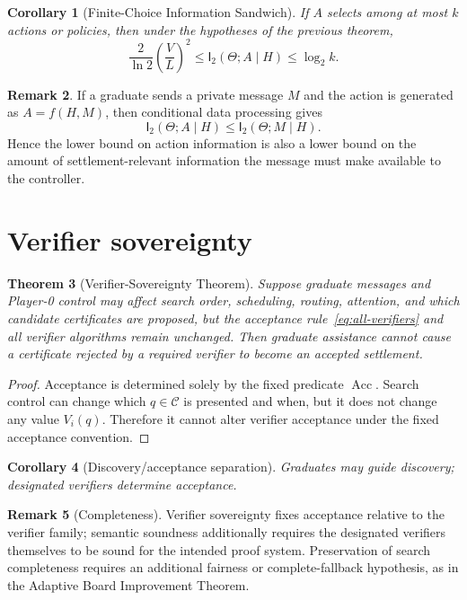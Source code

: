 \documentclass[11pt]{article}
\newtheorem{theorem}{Theorem}[section]
\newtheorem{corollary}[theorem]{Corollary}
\theoremstyle{definition}
\newtheorem{remark}[theorem]{Remark}
\newcommand{\I}{\mathsf{I}}
\newcommand{\Acc}{\operatorname{Acc}}
\begin{document}
\begin{corollary}[Finite-Choice Information Sandwich]
If $A$ selects among at most $k$ actions or policies, then under the hypotheses of the previous theorem,
\[
\boxed{
\frac{2}{\ln 2}\left(\frac{V}{L}\right)^2
\le
\I_2(\Theta;A\mid H)
\le
\log_2 k.
}
\]
\end{corollary}

\begin{remark}
If a graduate sends a private message $M$ and the action is generated as $A=f(H,M)$, then conditional data processing gives
\[
\I_2(\Theta;A\mid H)\le \I_2(\Theta;M\mid H).
\]
Hence the lower bound on action information is also a lower bound on the amount of settlement-relevant information the message must make available to the controller.
\end{remark}

\section{Verifier sovereignty}

\begin{theorem}[Verifier-Sovereignty Theorem]
Suppose graduate messages and Player-0 control may affect search order, scheduling, routing, attention, and which candidate certificates are proposed, but the acceptance rule~\eqref{eq:all-verifiers} and all verifier algorithms remain unchanged.  Then graduate assistance cannot cause a certificate rejected by a required verifier to become an accepted settlement.
\end{theorem}

\begin{proof}
Acceptance is determined solely by the fixed predicate $\Acc$.  Search control can change which $q\in\mathcal C$ is presented and when, but it does not change any value $V_i(q)$.  Therefore it cannot alter verifier acceptance under the fixed acceptance convention.
\end{proof}

\begin{corollary}[Discovery/acceptance separation]
Graduates may guide discovery; designated verifiers determine acceptance.
\end{corollary}

\begin{remark}[Completeness]
Verifier sovereignty fixes acceptance relative to the verifier family; semantic soundness additionally requires the designated verifiers themselves to be sound for the intended proof system.  Preservation of search completeness requires an additional fairness or complete-fallback hypothesis, as in the Adaptive Board Improvement Theorem.
\end{remark}
\end{document}
